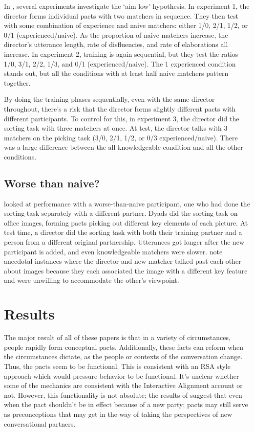 \documentclass[11pt]{article}
\begin{document}
	In \cite{yoonAudienceDesignMultiparty2019}, several experiments investigate the `aim low' hypothesis.  In experiment 1, the director forms individual pacts with two matchers in sequence. They then test with some combination of experience and naive matchers: either 1/0, 2/1, 1/2, or 0/1 (experienced/naive). As the proportion of naive matchers increase, the director's utterance length, rate of disfluencies, and rate of elaborations all increase. In experiment 2, training is again sequential, but they test the ratios 1/0, 3/1, 2/2, 1/3, and 0/1 (experienced/naive). The 1 experienced condition stands out, but all the conditions with at least half naive matchers pattern together.
	
	 By doing the training phases sequentially, even with the same director throughout, there's a risk that the director forms slightly different pacts with different participants. To control for this, in experiment 3, the director did the sorting task with three matchers at once. At test, the director talks with 3 matchers on the picking task (3/0, 2/1, 1/2, or 0/3 experienced/naive). There was a large difference between the all-knowledgeable condition and all the other conditions. 
	
	\subsection{Worse than naive?}
 \cite{weberCulturalConflictMerger2003} looked at performance with a worse-than-naive participant, one who had done the sorting task separately with a different partner. Dyads did the sorting task on office images, forming pacts picking out different key elements of each picture. At test time, a director did the sorting task with both their training partner and a person from a different original partnership. Utterances got longer after the new participant is added, and even knowledgeable matchers were slower. \cite{weberCulturalConflictMerger2003} note anecdotal instances where the director and new matcher talked past each other about images because they each associated the image with a different key feature and were unwilling to accommodate the other's viewpoint. 


\section{Results} %
The major result of all of these papers is that in a variety of circumstances, people rapidly form conceptual pacts. Additionally, these facts can reform when the circumstances dictate, as the people or contexts of the conversation change. Thus, the pacts seem to be functional. This is consistent with an RSA style approach which would pressure behavior to be functional. It's unclear whether some of the mechanics are consistent with the Interactive Alignment account or not. However, this functionality is not absolute; the results of \cite{weberCulturalConflictMerger2003} suggest that even when the pact shouldn't be in effect because of a new party; pacts may still serve as preconceptions that may get in the way of taking the perspectives of new conversational partners. 
\end{document}
